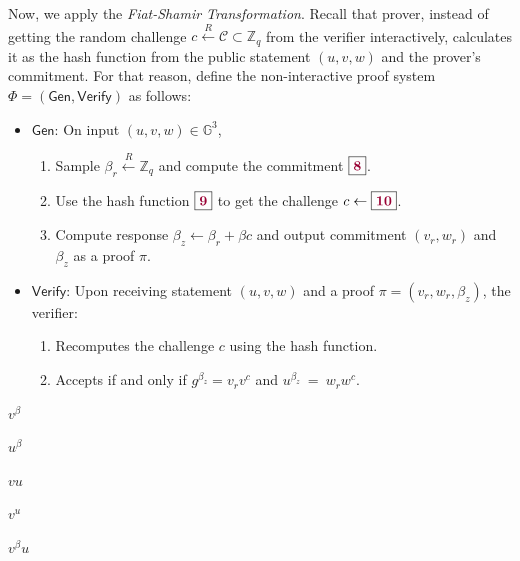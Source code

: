 \documentclass[../lecture-notes-105x135.tex]{subfiles}
\begin{document}
    Now, we apply the \textit{Fiat-Shamir Transformation}. Recall that prover, instead of getting the random challenge $c \xleftarrow{R} \mathcal{C} \subset \mathbb{Z}_q$ from the verifier interactively, calculates it as the hash function from the public statement $(u,v,w)$ and the prover's commitment. For that reason, define the non-interactive proof system $\Phi = (\mathsf{Gen}, \mathsf{Verify})$ as follows:
    \begin{itemize}[left=0mm]
        \item $\mathsf{Gen}$: On input $(u,v,w) \in \mathbb{G}^3$, 
        \begin{enumerate}[left=0mm]
            \item Sample $\beta_r \xleftarrow{R} \mathbb{Z}_q$ and compute the commitment $\boxed{\textcolor{purple!80!black}{\textbf{8}}}$.
            \item Use the hash function $\boxed{\textcolor{purple!80!black}{\textbf{9}}}$ to get the challenge $c \gets \boxed{\textcolor{purple!80!black}{\textbf{10}}}$.
            \item Compute response $\beta_z \gets \beta_r + \beta c$ and output commitment $(v_r,w_r)$ and $\beta_z$ as a proof $\pi$.
        \end{enumerate}
        \item $\mathsf{Verify}$: Upon receiving statement $(u,v,w)$ and a proof $\pi=(v_r,w_r,\beta_z)$, the verifier:
        \begin{enumerate}[left=0mm]
            \item Recomputes the challenge $c$ using the hash function.
            \item Accepts if and only if $g^{\beta_z} = v_r v^c$ and $u^{\beta_z}~=~w_r w^c$.
        \end{enumerate}
    \end{itemize}

    \newpage
     {
            \item $v^{\beta}$
            \item $u^{\beta}$
            \item $vu$
            \item $v^u$
            \item $v^{\beta}u$
    }
    
    
\end{document}
